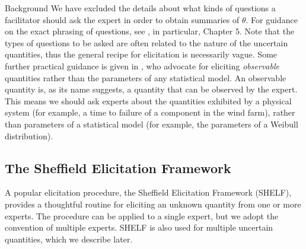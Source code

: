 \begin{chapter}{Background \label{Ch:background}}
We have excluded the details about what kinds of questions a facilitator should ask the expert in order to obtain summaries of $\theta$. For guidance on the exact phrasing of questions, see \citet{Ohagan06}, in particular, Chapter $5$. Note that the types of questions to be asked are often related to the nature of the uncertain quantities, thus the general recipe for elicitation is necessarily vague. Some further practical guidance is given in \citet{Kadane1998}, who advocate for eliciting \textit{observable} quantities rather than the parameters of any statistical model. An observable quantity is, as its name suggests, a quantity that can be observed by the expert. This means we should ask experts about the quantities exhibited by a physical system (for example, a time to failure of a component in the wind farm), rather than parameters of a statistical model (for example, the parameters of a Weibull distribution).

\subsection{The Sheffield Elicitation Framework}
A popular elicitation procedure, the Sheffield Elicitation Framework (SHELF), provides a thoughtful routine for eliciting an unknown quantity from one or more experts. The procedure can be applied to a single expert, but we adopt the convention of multiple experts. SHELF is also used for multiple uncertain quantities, which we describe later.


\end{chapter}
